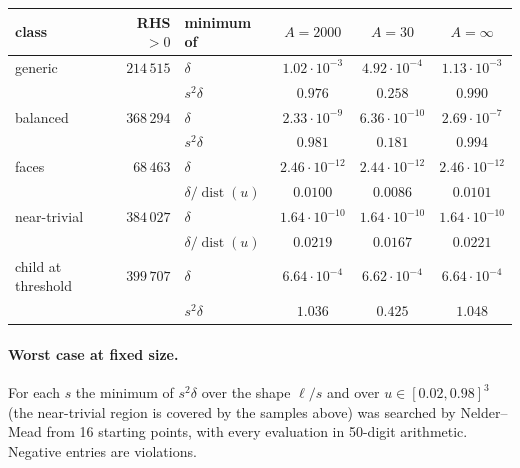 \documentclass[11pt]{article}
\theoremstyle{definition}
\numberwithin{equation}{section}
\begin{document}
\begin{center}
\begin{tabular}{lrlccc}
\toprule
class & RHS${}>0$ & minimum of & $A=2000$ & $A=30$ & $A=\infty$\\
\midrule
generic & $214\,515$ & $\delta$ & $1.02\cdot10^{-3}$ & $4.92\cdot10^{-4}$ & $1.13\cdot10^{-3}$\\
 & & $s^2\delta$ & $0.976$ & $0.258$ & $0.990$\\[2pt]
balanced & $368\,294$ & $\delta$ & $2.33\cdot10^{-9}$ & $6.36\cdot10^{-10}$ & $2.69\cdot10^{-7}$\\
 & & $s^2\delta$ & $0.981$ & $0.181$ & $0.994$\\[2pt]
faces & $68\,463$ & $\delta$ & $2.46\cdot10^{-12}$ & $2.44\cdot10^{-12}$ & $2.46\cdot10^{-12}$\\
 & & $\delta/\operatorname{dist}(u)$ & $0.0100$ & $0.0086$ & $0.0101$\\[2pt]
near-trivial & $384\,027$ & $\delta$ & $1.64\cdot10^{-10}$ & $1.64\cdot10^{-10}$ & $1.64\cdot10^{-10}$\\
 & & $\delta/\operatorname{dist}(u)$ & $0.0219$ & $0.0167$ & $0.0221$\\[2pt]
child at threshold & $399\,707$ & $\delta$ & $6.64\cdot10^{-4}$ & $6.62\cdot10^{-4}$ & $6.64\cdot10^{-4}$\\
 & & $s^2\delta$ & $1.036$ & $0.425$ & $1.048$\\
\bottomrule
\end{tabular}
\end{center}

\paragraph{Worst case at fixed size.} For each $s$ the minimum of $s^2\delta$ over the shape $\ell/s$ and over
$u\in[0.02,0.98]^3$ (the near-trivial region is covered by the samples above) was searched by Nelder--Mead from 16 starting
points, with every evaluation in 50-digit arithmetic. Negative entries are violations.
\end{document}
